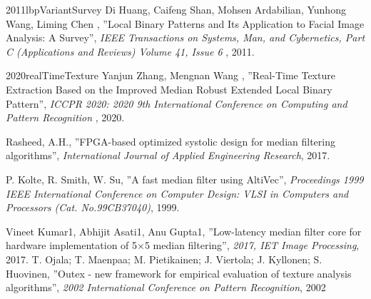 \documentclass[a4paper,12pt,oneside]{book}%
\begin{document}
\begin{thebibliography}{xx}
	
	{2011}{lbpVariantSurvey}
	Di Huang, Caifeng Shan, Mohsen Ardabilian, Yunhong Wang, Liming Chen
	, ''Local Binary Patterns and Its Application to Facial Image Analysis: A Survey'', {\em  IEEE Transactions on Systems, Man, and Cybernetics, Part C (Applications and Reviews) Volume 41, Issue 6 }, 2011.
	
	
	{2020}{realTimeTexture}
	Yanjun Zhang, Mengnan Wang
	, ''Real-Time Texture Extraction Based on the Improved Median Robust Extended Local Binary Pattern'', {\em  ICCPR 2020: 2020 9th International Conference on Computing and Pattern Recognition }, 2020.
	
	 	
	Rasheed, A.H., ''FPGA-based optimized systolic design for median filtering algorithms'', {\em International Journal of Applied Engineering Research}, 2017.
	
	P. Kolte, R. Smith,  W. Su, ''A fast median filter using AltiVec'', {\em  Proceedings 1999 IEEE International Conference on Computer Design: VLSI in Computers and Processors (Cat. No.99CB37040)}, 1999.
	
	Vineet Kumar1, Abhijit Asati1, Anu Gupta1, ''Low-latency median filter core for hardware implementation of 5×5 median filtering'', {\em  2017, IET Image Processing}, 2017.
	T. Ojala; T. Maenpaa; M. Pietikainen; J. Viertola; J. Kyllonen; S. Huovinen, ''Outex - new framework for empirical evaluation of texture analysis algorithms'', {\em  2002 International Conference on Pattern Recognition}, 2002
	
\end{thebibliography}
\end{document}
